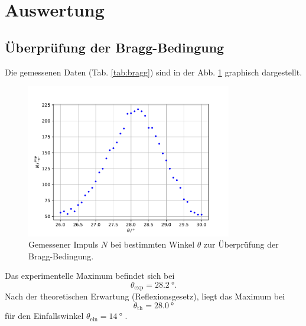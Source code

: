 \section{Auswertung}
\label{sec:Auswertung}

\subsection{Überprüfung der Bragg-Bedingung}
\label{sec:bragg}
Die gemessenen Daten (Tab. \ref{tab:bragg}) sind in der Abb. \ref{fig:bragg2} graphisch dargestellt.
\begin{figure}
    \centering
    \includegraphics[width=0.8\textwidth]{content/data/bragg.pdf}
    \caption{Gemessener Impuls $N$ bei bestimmten Winkel $\theta$ zur Überprüfung der Bragg-Bedingung. \cite{numpy} \cite{matplotlib}}
    \label{fig:bragg2}
\end{figure}
Das experimentelle Maximum befindet sich bei
\begin{equation*}
    \theta_\text{exp} = \SI{28.2}{\degree} .
\end{equation*}
Nach der theoretischen Erwartung (Reflexionsgesetz), liegt das Maximum bei
\begin{equation*}
    \theta_\text{th} = \SI{28.0}{\degree}
\end{equation*}
für den Einfallswinkel $\theta_\text{ein}=\SI{14}{\degree}$ .

